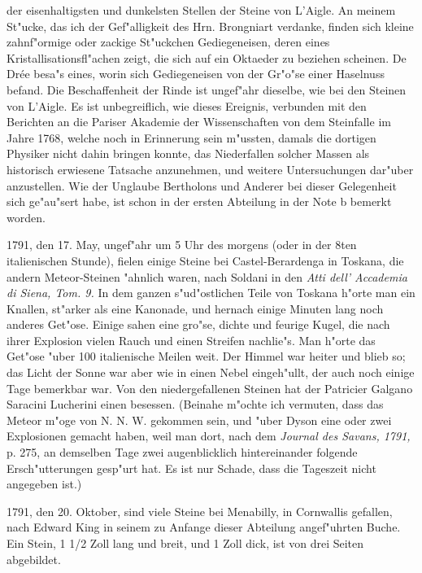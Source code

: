 \documentclass[a4paper, 11pt, oneside, polutonikogreek, german]{article}
\begin{document}
der eisenhaltigsten und dunkelsten Stellen der Steine von L'Aigle. An meinem St"ucke, das ich der Gef"alligkeit des Hrn. Brongniart verdanke, finden sich kleine zahnf"ormige oder zackige St"uckchen Gediegeneisen, deren eines Kristallisationsfl"achen zeigt, die sich auf ein Oktaeder zu beziehen scheinen. De Drée besa"s eines, worin sich Gediegeneisen von der Gr"o"se einer Haselnuss befand. Die Beschaffenheit der Rinde ist ungef"ahr dieselbe, wie bei den Steinen von L'Aigle. Es ist unbegreiflich, wie dieses Ereignis, verbunden mit den Berichten an die Pariser Akademie der Wissenschaften von dem Steinfalle im Jahre 1768, welche noch in Erinnerung sein m"ussten, damals die dortigen Physiker nicht dahin bringen konnte, das Niederfallen solcher Massen als historisch erwiesene Tatsache anzunehmen, und weitere Untersuchungen dar"uber anzustellen. Wie der Unglaube Bertholons und Anderer bei dieser Gelegenheit sich ge"au"sert habe, ist schon in der ersten Abteilung in der Note b bemerkt worden.

1791, den 17. May, ungef"ahr um 5 Uhr des morgens (oder in der 8ten italienischen Stunde), fielen einige Steine bei Castel-Berardenga in Toskana, die andern Meteor-Steinen "ahnlich waren, nach Soldani in den \emph{Atti dell' Accademia di Siena, Tom. 9.} In dem ganzen s"ud"ostlichen Teile von Toskana h"orte man ein Knallen, st"arker als eine Kanonade, und hernach einige Minuten lang noch anderes Get"ose. Einige sahen eine gro"se, dichte und feurige Kugel, die nach ihrer Explosion vielen Rauch und einen Streifen nachlie"s. Man h"orte das Get"ose "uber 100 italienische Meilen weit. Der Himmel war heiter und blieb so; das Licht der Sonne war aber wie in einen Nebel eingeh"ullt, der auch noch einige Tage bemerkbar war. Von den niedergefallenen Steinen hat der Patricier Galgano Saracini Lucherini einen besessen. (Beinahe m"ochte ich vermuten, dass das Meteor m"oge von N. N. W. gekommen sein, und "uber Dyson eine oder zwei Explosionen gemacht haben, weil man dort, nach dem \emph{Journal des Savans, 1791,} p. 275, an demselben Tage zwei augenblicklich hintereinander folgende Ersch"utterungen gesp"urt hat. Es ist nur Schade, dass die Tageszeit nicht angegeben ist.)

1791, den 20. Oktober, sind viele Steine bei Menabilly, in Cornwallis gefallen, nach Edward King in seinem zu Anfange dieser Abteilung angef"uhrten Buche. Ein Stein, 1 1/2 Zoll lang und breit, und 1 Zoll dick, ist von drei Seiten abgebildet.
\end{document}
